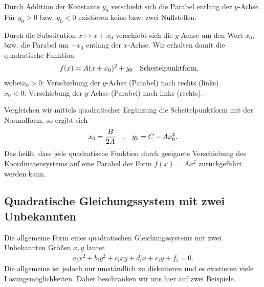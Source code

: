 Durch Addition der Konstante $y_0$ verschiebt sich die Parabel entlang der $y$-Achse. Für $y_0 > 0$ bzw. $y_0 <0$ existieren keine bzw. zwei Nullstellen.

Durch die Substitution $x \mapsto x+x_0$ verschiebt sich die $y$-Achse um den Wert $x_0$, bzw. die Parabel um $\minus x_0$ entlang der $x$-Achse. Wir erhalten damit die quadratische Funktion
\begin{align}
    f(x) = A(x+x_0)^2 + y_0 \qq{Scheitelpunktform,}
\end{align}
wobei\quad$x_0 > 0$: Verschiebung der $y$-Achse (Parabel) nach rechts (links) \\
\hphantom{wobei}\quad$x_0 < 0$: Verschiebung der $y$-Achse (Parabel) nach links (rechts).

\begin{wrapfigure}{r}{6cm}
    \centering
    \vspace{-5mm}
    \vspace{-5mm}
\end{wrapfigure}

Vergleichen wir mittels quadratischer Ergänzung die Scheitelpunktform mit der Normalform, so ergibt sich 
\begin{align}
    x_0 = \frac{B}{2A} \qq{,} y_0 = C -A x_0^2.
\end{align}
Das heißt, dass jede quadratische Funktion durch geeignete Verschiebung des Koordinatensystems auf eine Parabel der Form $f(x) = A x^2$ zurückgeführt werden kann.

\clearpage
\subsection{Quadratische Gleichungssystem mit zwei Unbekannten}

Die allgemeine Form eines quadratischen Gleichungssystems mit zwei Unbekannten Größen $x,y$ lautet 
\begin{align}
    a_i x^2 + b_i y^2 + c_i xy + d_i x + e_i y + f_i = 0.
\end{align}
Die allgemeine ist jedoch nur umständlich zu diskutieren und es existieren viele Lösungsmöglichkeiten. Daher beschränken wir uns hier auf zwei Beispiele. 

